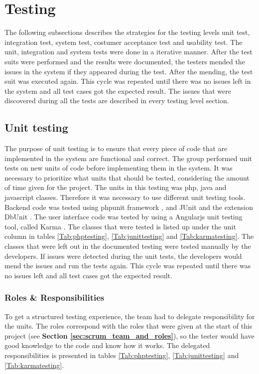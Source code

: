 \chapter{Testing}
\label{chap:testing}

The following subsections describes the strategies for the testing levels unit test, integration test, system test, costumer acceptance test and usability test. 
The unit, integration and system tests were done in a iterative manner. After the test suits were performed and the results were documented, the testers mended the issues in the system if they appeared during the test. After the mending, the test suit was executed again. This cycle was repeated until there was no issues left in the system and all test cases got the expected result. 
The issues that were discovered during all the tests are described in every testing level section. 


\section{Unit testing}
\label{sec:unit_testing}
The purpose of unit testing is to ensure that every piece of code that are implemented in the system are functional and correct. The group performed unit tests on new units of code before implementing them in the system. It was necessary to prioritize what units that should be tested, considering the amount of time given for the project. 
The units in this testing was php, java and javascript classes. Therefore it was necessary to use different unit testing tools. Backend code was tested using phpunit framework \cite{KF2}, and JUnit \cite{jUnit} and the extension DbUnit \cite{dbUnit}. The user interface code was tested by using a Angularjs unit testing tool, called Karma \cite{KF3}. 
The classes that were tested is listed up under the unit column in tables  \ref{Tab:phptesting}, \ref{Tab:junittesting} and \ref{Tab:karmatesting}. The classes that were left out in the documented testing were tested manually by the developers. If issues were detected during the unit tests, the developers would mend the issues and run the tests again. This cycle was repeated until there was no issues left and all test cases got the expected result.\newline

\subsection{Roles \& Responsibilities}
To get a structured testing experience, the team had to delegate responsibility for the units. The roles correspond with the roles that were given at the start of this project (see \textbf{Section \ref{sec:scrum_team_and_roles}}), so the tester would have good knowledge to the code and know how it works. The delegated responsibilities is presented in tables  \ref{Tab:phptesting}, \ref{Tab:junittesting} and \ref{Tab:karmatesting}.



